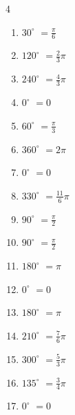 \begin{multicols}{4}
\begin{enumerate}
  \item $\displaystyle 30^{\circ}$
        $\displaystyle =\frac{\pi}{6}$

  \item $\displaystyle 120^{\circ}$
        $\displaystyle =\frac{2}{3}\pi$

  \item $\displaystyle 240^{\circ}$
        $\displaystyle =\frac{4}{3}\pi$

  \item $\displaystyle 0^{\circ}$
        $\displaystyle =0$

  \item $\displaystyle 60^{\circ}$
        $\displaystyle =\frac{\pi}{3}$

  \item $\displaystyle 360^{\circ}$
        $\displaystyle =2\pi$

  \item $\displaystyle 0^{\circ}$
        $\displaystyle =0$

\columnbreak %

  \item $\displaystyle 330^{\circ}$
        $\displaystyle =\frac{11}{6}\pi$

  \item $\displaystyle 90^{\circ}$
        $\displaystyle =\frac{\pi}{2}$

  \item $\displaystyle 90^{\circ}$
        $\displaystyle =\frac{\pi}{2}$

  \item $\displaystyle 180^{\circ}$
        $\displaystyle =\pi$

  \item $\displaystyle 0^{\circ}$
        $\displaystyle =0$

  \item $\displaystyle 180^{\circ}$
        $\displaystyle =\pi$

  \item $\displaystyle 210^{\circ}$
        $\displaystyle =\frac{7}{6}\pi$

  \item $\displaystyle 300^{\circ}$
        $\displaystyle =\frac{5}{3}\pi$

  \item $\displaystyle 135^{\circ}$
        $\displaystyle =\frac{3}{4}\pi$

  \item $\displaystyle 0^{\circ}$
        $\displaystyle =0$


\end{enumerate}
\end{multicols}

